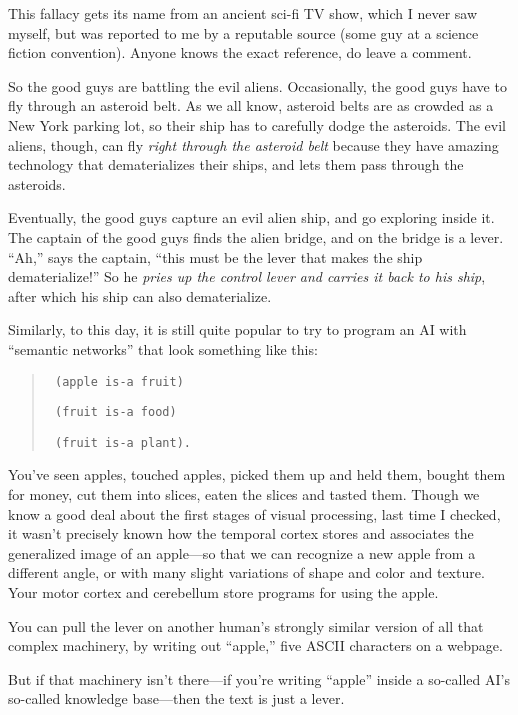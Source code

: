 \myendsectiontext


{
 This fallacy gets its name from an ancient sci-fi TV show, which I
never saw myself, but was reported to me by a reputable source (some
guy at a science fiction convention). Anyone knows the exact reference,
do leave a comment. }

{
 So the good guys are battling the evil aliens. Occasionally, the
good guys have to fly through an asteroid belt. As we all know,
asteroid belts are as crowded as a New York parking lot, so their ship
has to carefully dodge the asteroids. The evil aliens, though, can fly
\textit{right through the asteroid belt} because they have amazing
technology that dematerializes their ships, and lets them pass through
the asteroids.}

{
 Eventually, the good guys capture an evil alien ship, and go
exploring inside it. The captain of the good guys finds the alien
bridge, and on the bridge is a lever.
``Ah,'' says the captain,
``this must be the lever that makes the ship
dematerialize!'' So he \textit{pries up the control
lever and carries it back to his ship}, after which his ship can also
dematerialize.}

{
 Similarly, to this day, it is still quite popular to try to
program an AI with ``semantic
networks'' that look something like this:}

\begin{quote}
\texttt{
 (apple is-a fruit)}

\texttt{
 (fruit is-a food)}

\texttt{
  (fruit is-a plant).}
\end{quote}

{
 You've seen apples, touched apples, picked them up
and held them, bought them for money, cut them into slices, eaten the
slices and tasted them. Though we know a good deal about the first
stages of visual processing, last time I checked, it
wasn't precisely known how the temporal cortex stores
and associates the generalized image of an apple---so that we can
recognize a new apple from a different angle, or with many slight
variations of shape and color and texture. Your motor cortex and
cerebellum store programs for using the apple.}

{
 You can pull the lever on another human's strongly
similar version of all that complex machinery, by writing out
``apple,'' five ASCII characters on
a webpage.}

{
 But if that machinery isn't there---if
you're writing
``apple'' inside a so-called
AI's so-called knowledge base---then the text is just a
lever.}

